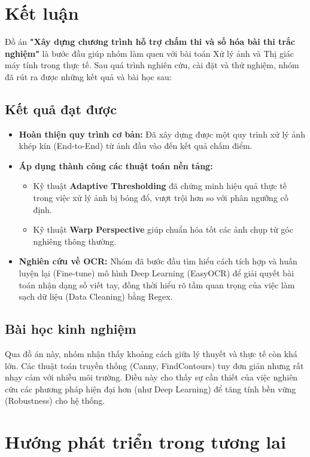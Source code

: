 \documentclass[6pt, a4paper]{report}
\begin{document}
	\section{Kết luận}
	
	Đồ án \textbf{"Xây dựng chương trình hỗ trợ chấm thi và số hóa bài thi trắc nghiệm"} là bước đầu giúp nhóm làm quen với bài toán Xử lý ảnh và Thị giác máy tính trong thực tế. Sau quá trình nghiên cứu, cài đặt và thử nghiệm, nhóm đã rút ra được những kết quả và bài học sau:
	
	\subsection{Kết quả đạt được}
	\begin{itemize}
		\item \textbf{Hoàn thiện quy trình cơ bản:} Đã xây dựng được một quy trình xử lý ảnh khép kín (End-to-End) từ ảnh đầu vào đến kết quả chấm điểm.
		
		\item \textbf{Áp dụng thành công các thuật toán nền tảng:}
		\begin{itemize}
			\item Kỹ thuật \textbf{Adaptive Thresholding} đã chứng minh hiệu quả thực tế trong việc xử lý ảnh bị bóng đổ, vượt trội hơn so với phân ngưỡng cố định.
			\item Kỹ thuật \textbf{Warp Perspective} giúp chuẩn hóa tốt các ảnh chụp từ góc nghiêng thông thường.
		\end{itemize}
		
		\item \textbf{Nghiên cứu về OCR:} Nhóm đã bước đầu tìm hiểu cách tích hợp và huấn luyện lại (Fine-tune) mô hình Deep Learning (EasyOCR) để giải quyết bài toán nhận dạng số viết tay, đồng thời hiểu rõ tầm quan trọng của việc làm sạch dữ liệu (Data Cleaning) bằng Regex.
	\end{itemize}
	
	\subsection{Bài học kinh nghiệm}
	Qua đồ án này, nhóm nhận thấy khoảng cách giữa lý thuyết và thực tế còn khá lớn. Các thuật toán truyền thống (Canny, FindContours) tuy đơn giản nhưng rất nhạy cảm với nhiễu môi trường. Điều này cho thấy sự cần thiết của việc nghiên cứu các phương pháp hiện đại hơn (như Deep Learning) để tăng tính bền vững (Robustness) cho hệ thống.
	
	\section{Hướng phát triển trong tương lai}
	
\end{document}
